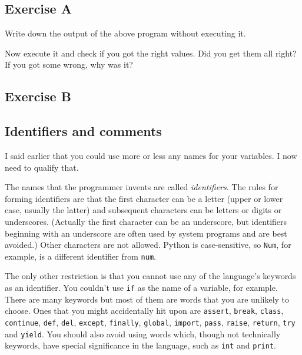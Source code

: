 
\subsection*{Exercise A}

Write down the output of the above program without executing it.


Now execute it and check if you got the right values. Did you get them
all right? If you got some wrong, why was it?

\subsection*{Exercise B}




\subsection{Identifiers and comments}

I said earlier that you could use more or less any names for your variables.
I now need to qualify that.

The names that the programmer invents are called \emph{identifiers}.  The
rules for forming identifiers are that the first character can be a letter
(upper or lower case, usually the latter) and subsequent characters
can be letters or digits 
or underscores.  (Actually the first character can be an underscore, but
identifiers beginning with an underscore are often used by system programs
and are best avoided.)  Other characters are not allowed.  Python is
case-sensitive, so \verb!Num!, for example, is a different identifier from
\verb!num!.

The only other restriction is that you cannot use any of the language's keywords
as an identifier.  You couldn't use \verb!if! as the name of a variable,
for example. There are many keywords but most of them are words that you
are unlikely to choose. 
Ones that you might accidentally hit upon are
\texttt{assert}, \texttt{break}, \texttt{class}, \texttt{continue},
\texttt{def}, \texttt{del}, \texttt{except}, \texttt{finally},
\texttt{global}, \texttt{import}, \texttt{pass}, \texttt{raise},
\texttt{return}, \texttt{try} and \texttt{yield}. You should also avoid 
using words which, though not technically keywords, have special significance
in the language, such as \verb!int! and \verb!print!.

